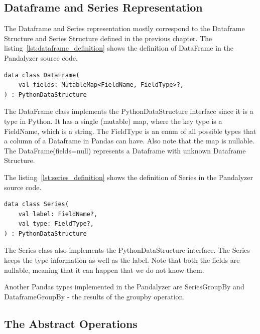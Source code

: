 
\subsection{Dataframe and Series Representation}\label{subsec:dataframe-and-series-representation}

The Dataframe and Series representation mostly correspond to the Dataframe Structure and Series Structure defined in the
previous chapter.
The listing~\ref{lst:dataframe_definition} shows the definition of DataFrame in the Pandalyzer source code.

\begin{lstlisting}[caption=Kotlin definition of the Dataframe, label={lst:dataframe_definition}, captionpos=b]
data class DataFrame(
    val fields: MutableMap<FieldName, FieldType>?,
) : PythonDataStructure
\end{lstlisting}

The DataFrame class implements the PythonDataStructure interface since it is a type in Python.
It has a single (mutable) map, where the key type is a FieldName, which is a string.
The FieldType is an enum of all possible types that a column of a Dataframe in Pandas can have.
Also note that the map is nullable.
The DataFrame(fields=null) represents a Dataframe with unknown Dataframe Structure.

The listing~\ref{lst:series_definition} shows the definition of Series in the Pandalyzer source code.

\begin{lstlisting}[caption=Kotlin definition of the Series, label={lst:series_definition}, captionpos=b]
data class Series(
    val label: FieldName?,
    val type: FieldType?,
) : PythonDataStructure
\end{lstlisting}

The Series class also implements the PythonDataStructure interface.
The Series keeps the type information as well as the label.
Note that both the fields are nullable, meaning that it can happen that we do not know them.

Another Pandas types implemented in the Pandalyzer are SeriesGroupBy and DataframeGroupBy - the results of the groupby
operation.

\subsection{The Abstract Operations}\label{subsec:the-abstract-operations}

